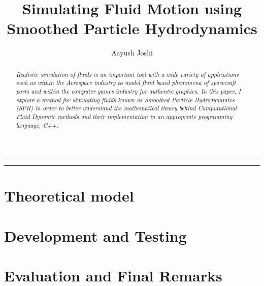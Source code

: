 \documentclass[a4paper,11pt]{article}
\title{\textbf{Simulating Fluid Motion using Smoothed Particle Hydrodynamics}}
\author{Aayush Joshi}
\date{}
\begin{document}
\maketitle

\par\noindent\rule{\textwidth}{0.3pt}

\begin{abstract}
\noindent \textit{Realistic simulation of fluids is an important tool with a wide variety of applications such as within the Aerospace industry to model fluid based phenomena of spacecraft parts and within the computer games industry for authentic graphics. In this paper, I explore a method for simulating fluids known as Smoothed Particle Hydrodynamics (SPH) in order to better understand the mathematical theory behind Computational Fluid Dynamic methods and their implementation in an appropriate programming language, C++.}
\end{abstract}

\par\noindent\rule{\textwidth}{0.3pt}
\tableofcontents
\newpage
\begin{multicols}{2}

\pagebreak


\section{Theoretical model}
\section{Development and Testing}
\section{Evaluation and Final Remarks}

\newpage
\nocite{*}


\end{multicols}
\end{document}
